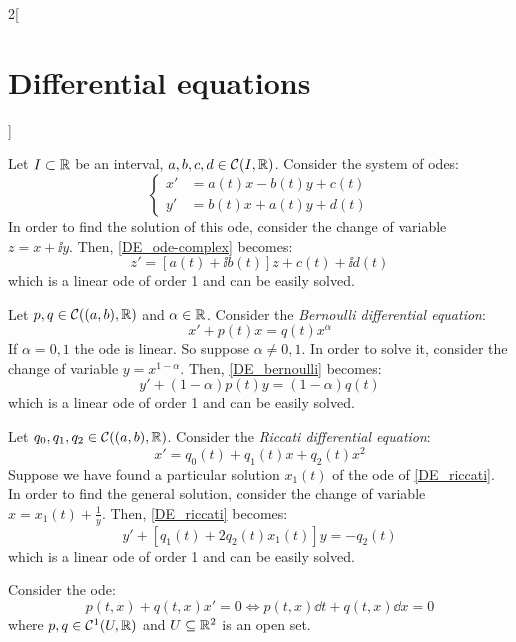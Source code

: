 \documentclass[../../../main_math.tex]{subfiles}
\begin{document}
\begin{multicols}{2}[\section{Differential equations}]
\begin{corollary}
\begin{itemize}
    \end{itemize}
  \end{corollary}
  \begin{method}
    Let $I\subset \mathbb{R}$ be an interval, $a,b,c,d\in\mathcal{C}(I,\mathbb{R})$. Consider the system of odes:
    \begin{equation}\label{DE_ode-complex}
      \left\{
      \begin{aligned}
        x' & =a(t)x-b(t)y+c(t) \\
        y' & =b(t)x+a(t)y+d(t)
      \end{aligned}
      \right.
    \end{equation}
    In order to find the solution of this ode, consider the change of variable $z=x+\ii y$. Then, \cref{DE_ode-complex} becomes:
    $$z'=[a(t)+\ii b(t)]z+c(t)+\ii d(t)$$ which is a linear ode of order 1 and can be easily solved.
  \end{method}
  \begin{method}
    Let $p,q\in\mathcal{C}((a,b),\mathbb{R})$ and $\alpha\in\mathbb{R}$. Consider the \emph{Bernoulli differential equation}:
    \begin{equation}\label{DE_bernoulli}
      x'+p(t)x=q(t)x^\alpha
    \end{equation}
    If $\alpha=0,1$ the ode is linear. So suppose $\alpha\ne 0,1$. In order to solve it, consider the change of variable $y=x^{1-\alpha}$. Then, \cref{DE_bernoulli} becomes:
    $$y'+(1-\alpha)p(t)y=(1-\alpha)q(t)$$  which is a linear ode of order 1 and can be easily solved.
  \end{method}
  \begin{method}
    Let $q_0,q_1,q_2\in\mathcal{C}((a,b),\mathbb{R})$. Consider the \emph{Riccati differential equation}:
    \begin{equation}\label{DE_riccati}
      x'=q_0(t)+q_1(t)x+q_2(t)x^2
    \end{equation}
    Suppose we have found a particular solution $x_1(t)$ of the ode of \cref{DE_riccati}. In order to find the general solution, consider the change of variable $x=x_1(t)+\frac{1}{y}$. Then, \cref{DE_riccati} becomes:
    $$y'+[q_1(t)+2q_2(t)x_1(t)]y=-q_2(t)$$ which is a linear ode of order 1 and can be easily solved.
  \end{method}
  \begin{method}
    Consider the ode: $$p(t,x)+q(t,x)x'=0\iff p(t,x)\dd{t}+q(t,x)\dd{x}=0$$ where $p,q\in\mathcal{C}^1(U,\mathbb{R})$ and $U\subseteq\mathbb{R}^2$ is an open set.

\end{method}
\end{multicols}
\end{document}
